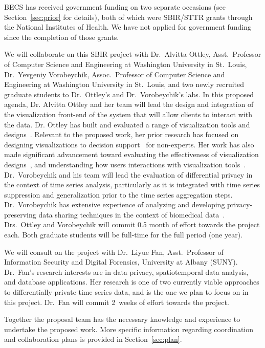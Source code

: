 BECS has received government funding on two separate occasions
(see Section~\ref{sec:prior} for details), both of which were SBIR/STTR
grants through the National Institutes of Health.  We have not applied for
government funding since the completion of those grants.

We will collaborate on this SBIR project with Dr.~Alvitta Ottley,
Asst.~Professor of Computer Science and Engineering at Washington University
in St.~Louis, Dr.~Yevgeniy Vorobeychik, Assoc.~Professor of Computer Science and Engineering at Washington University
in St.~Louis, and two newly recruited graduate students to
Dr.~Ottley's and Dr.~Vorobeychik's labs.
In this proposed agenda, Dr. Alvitta Ottley and her team will lead the design and integration of the visualization front-end of the system that will allow clients to interact with the data.
Dr. Ottley has built and evaluated a range of visualization tools and designs~\cite{brown2014finding, hakone2017proact,ottley2015personality,peck2013using}. 
Relevant to the proposed work, her prior research has focused on designing visualizations to decision support~\cite{hakone2017proact,ottley2012visually,ottley2016improving} for non-experts. 
Her work has also made significant advancement toward evaluating the
effectiveness of visualization
designs~\cite{peck2013using,ziemkiewicz2013visualization}, and
understanding how users interactions with visualization
tools~\cite{brown2014finding,ottley2015personality}.  
Dr.~Vorobeychik and his team will lead the evaluation of differential
privacy in the context of time series analysis, particularly as it is
integrated with time series suppression and generalization prior to
the time series aggregation steps.
Dr.~Vorobeychik has extensive experience of analyzing and developing
privacy-preserving data sharing techniques in the context of
biomedical data~\cite{Wan15,Wan17a,Wan17b,Xia15}.
Drs.~Ottley and Vorobeychik will commit 0.5 month of effort towards
the project each.
Both graduate students will be full-time for the full period (one year).

We will consult on the project with Dr.~Liyue Fan, Asst.~Professor
of Information Security and Digital Forensics, University at Albany (SUNY).
Dr.~Fan's research interests are in data privacy, spatiotemporal data
analysis, and database applications.  Her research is one of two
currently viable approaches to differentially private time series data,
and is the one we plan to focus on in this project.
Dr.~Fan will commit 2~weeks of effort towards the project.

Together the proposal team has the necessary knowledge and experience to undertake the proposed work. 
More specific information regarding coordination and collaboration plans is
provided in Section~\ref{sec:plan}.
